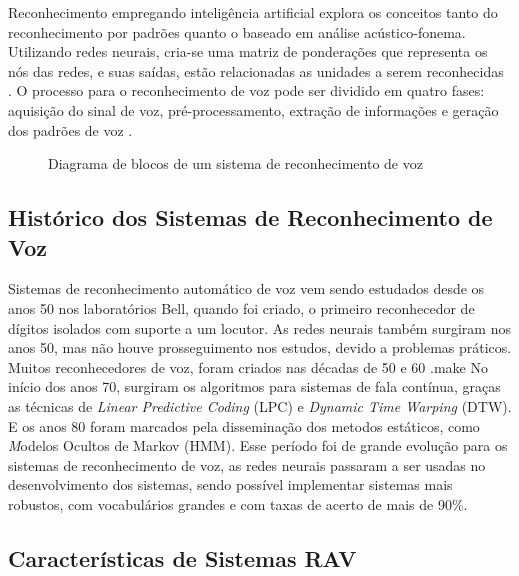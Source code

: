 Reconhecimento empregando inteligência artificial explora os conceitos tanto do reconhecimento por padrões quanto o baseado em análise acústico-fonema. Utilizando redes neurais, cria-se uma matriz de ponderações que representa os nós das redes, e suas saídas, estão relacionadas as unidades a serem reconhecidas \cite{AvaliaTecJose}.
O processo para o reconhecimento de voz pode ser dividido em quatro fases: aquisição do sinal de voz, pré-processamento, extração de informações e geração dos padrões de voz \cite{RavIsolAnderson}.

\begin{figure}[H]
\centering

\caption{Diagrama de blocos de um sistema de reconhecimento de voz}
\end{figure}





\subsection{Histórico dos Sistemas de Reconhecimento de Voz}\label{sec:red_khn}

Sistemas de reconhecimento automático de voz vem sendo estudados desde os anos 50 nos laboratórios Bell, quando foi criado, o primeiro reconhecedor de dígitos isolados com suporte a um locutor.\cite{Historico1} As redes neurais também surgiram nos anos 50, mas não houve prosseguimento nos estudos, devido a problemas práticos. Muitos reconhecedores de voz, foram criados nas décadas de 50 e 60 \cite{RavSpeechSadaoki}.make No início dos anos 70, surgiram os algoritmos para sistemas de fala contínua, graças as técnicas de \textit{Linear Predictive Coding} (LPC) e \textit{Dynamic Time Warping} (DTW). \cite{FundamentRabiner} E os anos 80 foram marcados pela disseminação dos metodos estáticos, como \textit Modelos Ocultos de Markov (HMM). \cite{FundamentRabiner} Esse período foi de grande evolução para os sistemas de reconhecimento de voz, as redes neurais passaram a ser usadas no desenvolvimento dos sistemas, sendo possível implementar sistemas mais robustos, com vocabulários grandes e com taxas de acerto de mais de 90{\%}.\cite{AvaliaTecJose} 

\subsection{Características de Sistemas RAV}\label{sec:red_neu}

